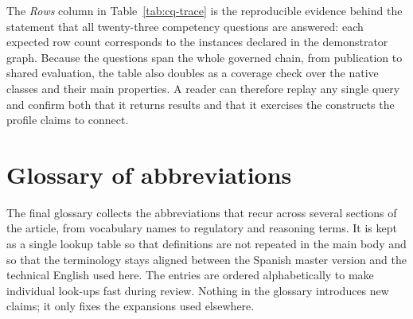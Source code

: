 \documentclass[Afour,sagev,times]{sagej}
\begin{document}
The \emph{Rows} column in Table~\ref{tab:cq-trace} is the reproducible evidence behind the statement that all twenty-three competency questions are answered: each expected row count corresponds to the instances declared in the demonstrator graph. Because the questions span the whole governed chain, from publication to shared evaluation, the table also doubles as a coverage check over the native classes and their main properties. A reader can therefore replay any single query and confirm both that it returns results and that it exercises the constructs the profile claims to connect.

\section{Glossary of abbreviations}\label{app:glossary}

The final glossary collects the abbreviations that recur across several sections of the article, from vocabulary names to regulatory and reasoning terms. It is kept as a single lookup table so that definitions are not repeated in the main body and so that the terminology stays aligned between the Spanish master version and the technical English used here. The entries are ordered alphabetically to make individual look-ups fast during review. Nothing in the glossary introduces new claims; it only fixes the expansions used elsewhere.
\end{document}
